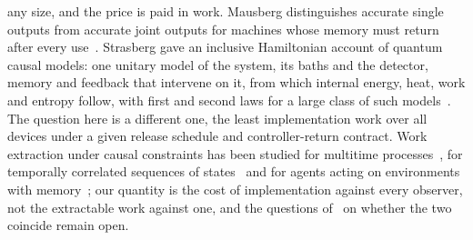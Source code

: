 any size, and the price is paid in work. Mausberg distinguishes accurate single outputs from accurate joint outputs for machines whose memory must return after every use~\cite{Mausberg26}. Strasberg gave an inclusive Hamiltonian account of quantum causal models: one unitary model of the system, its baths and the detector, memory and feedback that intervene on it, from which internal energy, heat, work and entropy follow, with first and second laws for a large class of such models~\cite{Strasberg20}. The question here is a different one, the least implementation work over all devices under a given release schedule and controller-return contract. Work extraction under causal constraints has been studied for multitime processes~\cite{ZambonAdesso}, for temporally correlated sequences of states~\cite{HuangTOFE} and for agents acting on environments with memory~\cite{Fiderer26}; our quantity is the cost of implementation against every observer, not the extractable work against one, and the questions of~\cite{ZambonAdesso,Fiderer26} on whether the two coincide remain open.

